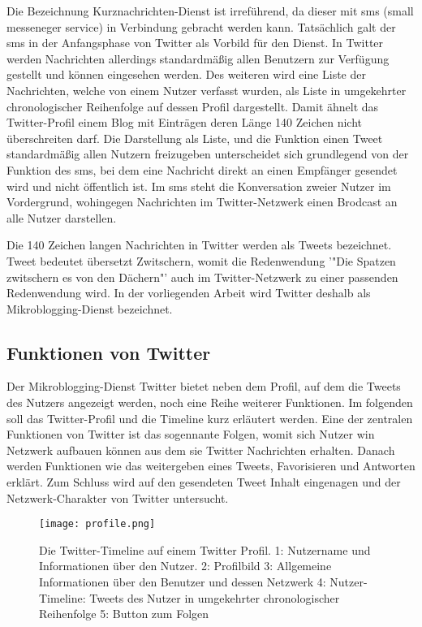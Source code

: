 		Die Bezeichnung Kurznachrichten-Dienst ist irreführend, da dieser mit sms (small messeneger service) in Verbindung gebracht werden kann. 
		Tatsächlich galt der sms in der Anfangsphase von Twitter als Vorbild für den Dienst.
		In Twitter werden Nachrichten allerdings standardmäßig allen Benutzern zur Verfügung gestellt und können eingesehen werden. 
		Des weiteren wird eine Liste der Nachrichten, welche von einem Nutzer verfasst wurden, als Liste in umgekehrter chronologischer Reihenfolge auf dessen Profil dargestellt.
		Damit ähnelt das Twitter-Profil einem Blog mit Einträgen deren Länge 140 Zeichen nicht überschreiten darf. 
		Die Darstellung als Liste, und die Funktion einen Tweet standardmäßig allen Nutzern freizugeben unterscheidet sich grundlegend von der Funktion des sms, bei dem eine Nachricht direkt an einen Empfänger gesendet wird und nicht öffentlich ist.
		Im sms steht die Konversation zweier Nutzer im Vordergrund, wohingegen Nachrichten im Twitter-Netzwerk einen Brodcast an alle Nutzer darstellen.

		Die 140 Zeichen langen Nachrichten in Twitter werden als Tweets bezeichnet.
		Tweet bedeutet übersetzt Zwitschern, womit die Redenwendung '"Die Spatzen zwitschern es von den Dächern"' auch im Twitter-Netzwerk zu einer passenden Redenwendung  wird.  
		In der vorliegenden Arbeit wird Twitter deshalb als Mikroblogging-Dienst bezeichnet.
	

		\subsection{Funktionen von Twitter}
		Der Mikroblogging-Dienst Twitter bietet neben dem Profil, auf dem die Tweets des Nutzers angezeigt werden, noch eine Reihe weiterer Funktionen. 
		Im folgenden soll das Twitter-Profil und die Timeline kurz erläutert werden. 
		Eine der zentralen Funktionen von Twitter ist das sogennante Folgen, womit sich Nutzer win Netzwerk aufbauen können aus dem sie Twitter Nachrichten erhalten.
		Danach werden Funktionen wie das weitergeben eines Tweets, Favorisieren und Antworten erklärt. 
		Zum Schluss wird auf den gesendeten Tweet Inhalt eingenagen und der Netzwerk-Charakter von Twitter untersucht.

		\begin{figure}[h!]
		\begin{center}
		\texttt{[image: profile.png]}
		\caption{Die Twitter-Timeline auf einem Twitter Profil. 1: Nutzername und Informationen über den Nutzer. 2: Profilbild
		3: Allgemeine Informationen über den Benutzer und dessen Netzwerk
		4: Nutzer-Timeline: Tweets des Nutzer in umgekehrter chronologischer Reihenfolge 
		5: Button zum Folgen}
		\label{img:twitterProfile}
		\end{center}
		\end{figure}	


